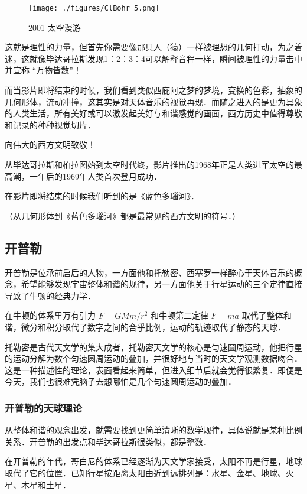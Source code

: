 \begin{figure}[ht]
\centering
\texttt{[image: ./figures/ClBohr\_5.png]}
\caption{2001 太空漫游} \label{ClBohr_fig5}
\end{figure}


这就是理性的力量，但首先你需要像那只人（猿）一样被理想的几何打动，为之着迷，这就像毕达哥拉斯发现1：2：3：4可以解释音程一样，瞬间被理性的力量击中并宣称 “万物皆数”！

而当影片即将结束的时候，我们看到类似西庇阿之梦的梦境，变换的色彩，抽象的几何形体，流动冲撞，这其实是对天体音乐的视觉再现．而随之进入的是更为具象的人类生活，所有美好或可以激发起美好与和谐感觉的画面，西方历史中值得尊敬和记录的种种视觉切片．

向伟大的西方文明致敬！

从毕达哥拉斯和柏拉图始到太空时代终，影片推出的1968年正是人类进军太空的最高潮，一年后的1969年人类首次登月成功．

在影片即将结束的时候我们听到的是《蓝色多瑙河》．

（从几何形体到《蓝色多瑙河》都是最常见的西方文明的符号．）


\subsection{开普勒}

开普勒是位承前启后的人物，一方面他和托勒密、西塞罗一样醉心于天体音乐的概念，希望能够发现宇宙整体和谐的规律，另一方面他关于行星运动的三个定律直接导致了牛顿的经典力学．

在牛顿的体系里万有引力 $F = G M m /r^2$ 和牛顿第二定律 $F = ma$ 取代了整体和谐，微分和积分取代了数字之间的合乎比例，运动的轨迹取代了静态的天球．

托勒密是古代天文学的集大成者，托勒密天文学的核心是匀速圆周运动，他把行星的运动分解为数个匀速圆周运动的叠加，并很好地与当时的天文学观测数据吻合．这是一种描述性的理论，表面看起来简单，但进入细节后就会觉得很繁复．即便是今天，我们也很难凭脑子去想哪怕是几个匀速圆周运动的叠加．

\subsubsection{开普勒的天球理论}

从整体和谐的观念出发，就需要找到更简单清晰的数学规律，具体说就是某种比例关系．开普勒的出发点和毕达哥拉斯很类似，都是整数．

在开普勒的年代，哥白尼的体系已经逐渐为天文学家接受，太阳不再是行星，地球取代了它的位置．已知行星按距离太阳由近到远排列是：水星、金星、地球、火星、木星和土星．

